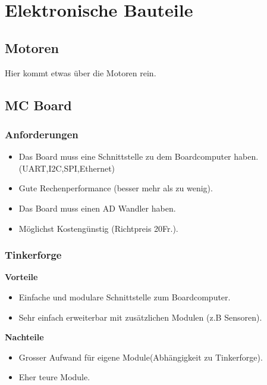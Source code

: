 \section{Elektronische Bauteile}
\subsection {Motoren}
Hier kommt etwas über die Motoren rein.

\subsection*{MC Board}
\subsubsection{Anforderungen}
\begin{itemize}
\item Das Board muss eine Schnittstelle zu dem Boardcomputer haben. (UART,I2C,SPI,Ethernet)
\item Gute Rechenperformance (besser mehr als zu wenig).
\item Das Board muss einen AD Wandler haben.
\item Möglichst Kostengünstig (Richtpreis 20Fr.).
\end{itemize}


\subsubsection{Tinkerforge}
\textbf {Vorteile}
\begin{itemize}
\item Einfache und modulare Schnittstelle zum Boardcomputer.
\item Sehr einfach erweiterbar mit zusätzlichen Modulen (z.B Sensoren).\\
\end{itemize}
\textbf {Nachteile}
\begin{itemize}
\item Grosser Aufwand für eigene Module(Abhängigkeit zu Tinkerforge).
\item Eher teure Module.		
\end{itemize}


